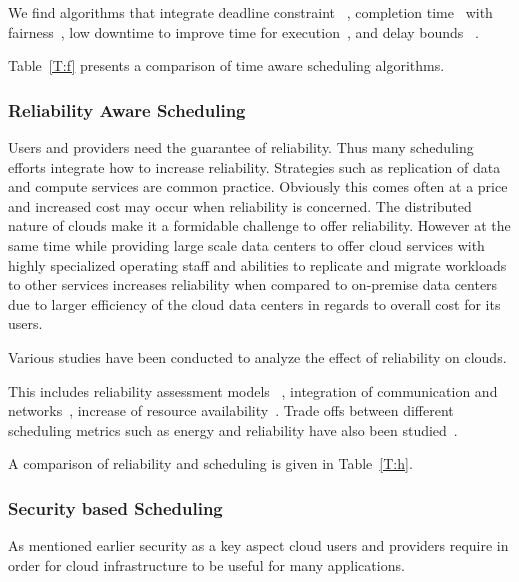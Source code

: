 \documentclass[final,5p,times,twocolumn]{elsarticle}
\begin{document}
We find algorithms that integrate
deadline constraint ~\cite{li2016energy}, 
completion time~\cite{xu2011job} with fairness~\cite{jasso1989theory}, 
low downtime to improve time for execution~\cite{frincu2014scheduling},
and 
delay bounds 
~\cite{yuan2018time}.

Table~\ref{T:f} presents a comparison of time aware
scheduling algorithms.



\subsubsection{Reliability Aware Scheduling}\label{sec:reliability}



Users and providers need the guarantee of reliability. Thus many
scheduling efforts integrate how to increase reliability. Strategies
such as replication of data and compute services are common
practice. Obviously this comes often at a price and increased cost may
occur when reliability is concerned. The distributed nature of clouds
make it a formidable challenge to offer reliability. However at the
same time while providing large scale data centers to offer cloud
services with highly specialized operating staff and abilities to
replicate and migrate workloads to other services increases
reliability when compared to on-premise data centers due to larger
efficiency of the cloud data centers in regards to overall cost for
its users.

Various studies have been conducted to analyze the effect of reliability on clouds.

This includes reliability assessment models
~\cite{malik2012reliability}, integration of communication and
networks~\cite{jing2015reliability}, increase of resource
availability~\cite{latiff2016fault}. Trade offs between different
scheduling metrics such as energy and reliability have also been
studied~\cite{tang2016energy}.

A comparison of reliability and scheduling is given in Table~\ref{T:h}.





\subsubsection{Security based Scheduling}\label{sec:security}



As mentioned earlier security as a key aspect cloud users and
providers require in order for cloud infrastructure to be useful for
many applications.
\end{document}

